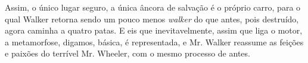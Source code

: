 \begin{multicols}{2}
\par
{
}
\par
\par{}Assim,\allowbreak{} o único lugar seguro,\allowbreak{} a única âncora de salvação é o próprio carro,\allowbreak{} para o qual Walker retorna sendo um pouco menos \textit{walker} do que antes,\allowbreak{} pois destruído,\allowbreak{} agora caminha a quatro patas.\allowbreak{} E eis que inevitavelmente,\allowbreak{} assim que liga o motor,\allowbreak{} a metamorfose,\allowbreak{} digamos,\allowbreak{} básica,\allowbreak{} é representada,\allowbreak{} e Mr.\allowbreak{} Walker reassume as feições e paixões do terrível Mr.\allowbreak{} Wheeler,\allowbreak{} com o mesmo processo de antes.\allowbreak{}

\end{multicols}
